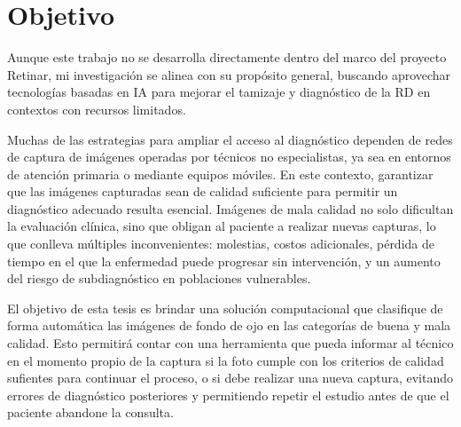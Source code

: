\chapter{Objetivo}

Aunque este trabajo no se desarrolla directamente dentro del marco del proyecto Retinar, mi investigación se alinea con su propósito general, buscando aprovechar tecnologías basadas en IA para mejorar el tamizaje y diagnóstico de la RD en contextos con recursos limitados.

Muchas de las estrategias para ampliar el acceso al diagnóstico dependen de redes de captura de imágenes operadas por técnicos no especialistas, ya sea en entornos de atención primaria o mediante equipos móviles. En este contexto, garantizar que las imágenes capturadas sean de calidad suficiente para permitir un diagnóstico adecuado resulta esencial. Imágenes de mala calidad no solo dificultan la evaluación clínica, sino que obligan al paciente a realizar nuevas capturas, lo que conlleva múltiples inconvenientes: molestias, costos adicionales, pérdida de tiempo en el que la enfermedad puede progresar sin intervención, y un aumento del riesgo de subdiagnóstico en poblaciones vulnerables.

El objetivo de esta tesis es brindar una solución computacional que clasifique de forma automática las imágenes de fondo de ojo en las categorías de buena y mala calidad. Esto permitirá contar con una herramienta que pueda informar al técnico en el momento propio de la captura si la foto cumple con los criterios de calidad sufientes para continuar el proceso, o si debe realizar una nueva captura, evitando errores de diagnóstico posteriores y permitiendo repetir el estudio antes de que el paciente abandone la consulta.

